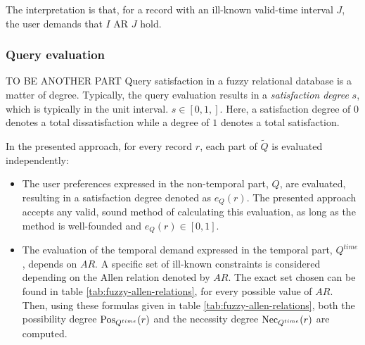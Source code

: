 The interpretation is that, for a record with an ill-known valid-time interval $J$, the user demands that $I$ AR $J$ hold.

\subsubsection{Query evaluation} TO BE ANOTHER PART
\label{subsubsec:query-evaluation}
Query satisfaction in a fuzzy relational database is a matter of degree. Typically, the query evaluation results in a \emph{satisfaction degree} $s$, which is typically in the unit interval. $s \in \left[ 0,1,\right]$. Here, a satisfaction degree of $0$ denotes a total dissatisfaction while a degree of $1$ denotes a total satisfaction.



In the presented approach, for every record $r$, each part of $\tilde{Q}$ is evaluated independently:
\begin{itemize}
\item
The user preferences expressed in the non-temporal part, $Q$, are evaluated, resulting in a satisfaction degree denoted as $e_Q(r)$. The presented approach accepts any valid, sound method of calculating this evaluation, as long as the method is well-founded and $e_Q(r) \in \left[0,1\right]$.
\item
The evaluation of the temporal demand expressed in the temporal part, $Q^{time}$, depends on $AR$. A specific set of ill-known constraints\cite{Pon11} is considered depending on the Allen relation denoted by $AR$. The exact set chosen can be found in table \ref{tab:fuzzy-allen-relations}, for every possible value of $AR$. Then, using these formulas given in table \ref{tab:fuzzy-allen-relations}, both the possibility degree $\operatorname{Pos}_{Q^{time}}(r)$ and the necessity degree $\operatorname{Nec}_{Q^{time}}(r)$ are computed.
\end{itemize}


